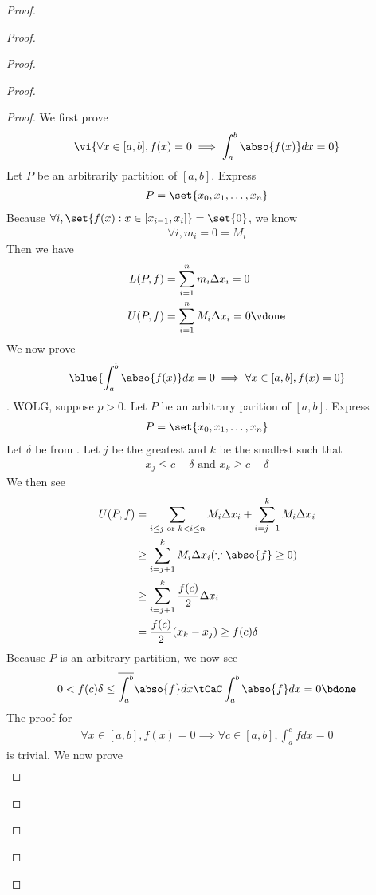 \documentclass{report}
\begin{document}
\begin{proof}
\begin{proof}
\begin{proof}
\begin{proof}
\begin{question}{}{}
\end{question}
\begin{proof}
We first prove 
\begin{align*}
\vi{\forall x\in [a,b], f(x)=0\implies \int_a^b \abso{f(x)}dx=0}
\end{align*}
Let $P$ be an arbitrarily partition of $[a,b]$. Express 
\begin{align*}
P=\set{x_0,x_1,\dots ,x_n}
\end{align*}
Because $\forall i,\set{f(x):x\in [x_{i-1},x_i]}=\set{0}$, we know 
\begin{align*}
\forall i,m_i=0=M_i
\end{align*}
Then we have 
\begin{align*}
L(P,f)&=\sum_{i=1}^n m_i\Delta x_i=0\\
U(P,f)&=\sum_{i=1}^n M_i\Delta x_i=0\vdone
\end{align*}
We now prove 
\begin{align*}
\blue{\int_a^b \abso{f(x)}dx=0\implies \forall x\in [a,b],f(x)=0}
\end{align*}
. WOLG, suppose $p >0$. Let $P$ be an arbitrary parition of  $[a,b]$. Express 
\begin{align*}
P=\set{x_0,x_1,\dots, x_n}
\end{align*}
Let $\delta$ be from . Let $j$ be the greatest and $k$ be the smallest such that 
 \begin{align*}
x_j\leq c-\delta \text{ and }x_k\geq c+\delta
\end{align*}
We then see 
\begin{align*}
U(P,f)&=\sum_{i\leq j\text{ or }k<i\leq n} M_i \Delta x_i+ \sum_{i=j+1}^k M_i\Delta x_i\\
&\geq \sum_{i=j+1}^k M_i \Delta x_i (\because \abso{f}\geq 0)\\
&\geq \sum_{i=j+1}^k \frac{f(c)}{2}\Delta x_i \\
&= \frac{f(c)}{2} (x_k-x_j)\geq f(c)\delta
\end{align*}
Because $P$ is an arbitrary partition,  we now see  
\begin{align*}
0<f(c)\delta \leq \overline{\int_a^b}\abso{f}dx \tCaC \int_a^b \abso{f}dx=0 \bdone
\end{align*}
The proof for 
\begin{align*}
\forall x\in [a,b],f(x)=0\implies \forall c\in [a,b], \int_a^cfdx=0
\end{align*}
is trivial. We now prove 
\begin{align*}

\end{align*}
\end{proof}
\end{proof}
\end{proof}
\end{proof}
\end{proof}
\end{document}
